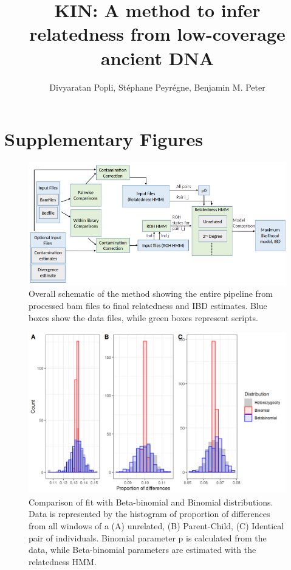 \documentclass[12pt, letterpaper]{article}
\title{KIN: A method to infer relatedness from low-coverage ancient DNA}
\author{Divyaratan Popli, Stéphane Peyrégne, Benjamin M. Peter}
\begin{document}
\maketitle
\section*{Supplementary Figures}


\renewcommand{\figurename}{Fig. S}
\begin{figure}[h!]
    \includegraphics[width=18cm]{plots/inkscape_finalImg/schematic1.png}
    \centering
    \caption{Overall schematic of the method showing the entire pipeline from processed bam files to final relatedness and IBD estimates. Blue boxes show the data files, while green boxes represent scripts.}
    \label{figS0:schematic}
\end{figure}




\begin{figure}[h!]
    \includegraphics[width=18cm]{supplementary_info/plots/binom.png}
    \centering
    \caption{Comparison of fit with Beta-binomial and Binomial distributions. Data is represented by the histogram of proportion of differences from all windows of a (A) unrelated, (B) Parent-Child, (C) Identical pair of individuals. Binomial parameter p is calculated from the data, while Beta-binomial parameters are estimated with the relatedness HMM.}
    \label{figS1:binom}
    
\end{figure}
\end{document}
